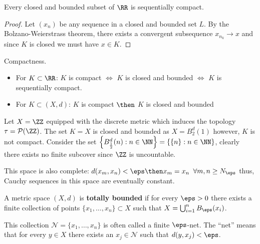\documentclass[12pt, a4paper]{article}
\begin{document}
\begin{lemma}
    Every closed and bounded subset of \(\RR\) is sequentially compact.
\end{lemma}

\begin{proof}
    Let \((x_n)\) be any sequence in a closed and bounded set \(L\). By the Bolzano-Weierstrass theorem, there exists a convergent subsequence \(x_{n_k} \to x\) and since \(K\) is closed we must have \(x \in K\).
\end{proof}

\begin{mdthm}[Stocktaking]
    Compactness.
    \begin{itemize}
        \item For \(K \subset \RR\): \(K\) is compact \(\iff\) \(K\) is closed and bounded \(\iff\) \(K\) is sequentially compact.
        \item For \(K \subset (X,d)\): \(K\) is compact \(\then\) \(K\) is closed and bounded 
    \end{itemize}
\end{mdthm}

\begin{mdexample}
    Let \(X = \ZZ\) equipped with the discrete metric which induces the topology \(\tau = \mathcal{P}(\ZZ)\). The set \(K=X\) is closed and bounded as \(X = B_2^d(1)\) however, \(K\) is not compact. Consider the set \(\left\{B_{\frac{1}{2}}^d(n): n \in \NN\right\} = \{\{n\} : n \in \NN\}\), clearly there exists no finite subcover since \(\ZZ\) is uncountable.

    This space is also complete: \(d(x_m,x_n)<\eps \then x_m=x_n\) \(\forall m,n \geq N_{\eps}\) thus, Cauchy sequences in this space are eventually constant.
\end{mdexample}

\begin{definition}
    A metric space \((X,d)\) is \textbf{totally bounded} if for every \(\eps>0\) there exists a finite collection of points \(\{x_1,\ldots,x_n\} \subset X\) such that \(X = \bigcup_{i=1}^n B_{\eps}(x_i)\).
\end{definition}

\begin{mdremark}
    This collection \(\mathcal{N}=\{x_1,\ldots,x_n\}\) is often called a finite \(\eps\)-net. The ``net'' means that for every \(y \in X\) there exists an \(x_j \in \mathcal{N}\) such that \(d(y,x_j)<\eps\).
\end{mdremark}
\end{document}
